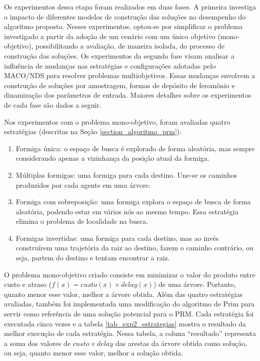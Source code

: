 Os experimentos dessa etapa foram realizados em duas fases. A primeira investiga o impacto de diferentes modelos de construção das soluções no desempenho do algoritmo proposto. Nesses experimentos, optou-se por simplificar o problema investigado a partir da adoção de um cenário com um único objetivo (mono-objetivo), possibilitando a avaliação, de maneira isolada, do processo de construção das soluções. Os experimentos da segunda fase visam analisar a influência de mudanças nas estratégias e configurações adotadas pelo MACO/NDS para resolver problemas multiobjetivos. Essas mudanças envolvem a construção de soluções por amostragem, formas de depósito de feromônio e dinamização dos parâmetros de entrada. Maiores detalhes sobre os experimentos de cada fase são dados a seguir.

Nos experimentos com o problema mono-objetivo, foram avaliadas quatro estratégias (descritas na Seção \ref{section_algoritmo_prm}):

\begin{enumerate}
	\item Formiga única: o espaço de busca é explorado de forma aleatória, mas sempre considerando apenas a vizinhança da posição atual da formiga.
	\item Múltiplas formigas: uma formiga para cada destino. Une-se os caminhos produzidos por cada agente em uma árvore.
	\item Formiga com sobreposição: uma formiga explora o espaço de busca de forma aleatória, podendo estar em vários nós ao mesmo tempo. Essa estratégia elimina o problema de localidade na busca.
	\item Formigas invertidas: uma formiga para cada destino, mas ao invés construírem uma trajetória da raiz ao destino, fazem o caminho contrário, ou seja, partem do destino e tentam encontrar a raiz.
\end{enumerate}

O problema mono-objetivo criado consiste em minimizar o valor do produto entre custo e atraso ($f(x) = custo(x) \times delay(x)$) de uma árvore. Portanto, quanto menor esse valor, melhor a árvore obtida. Além das quatro estratégias avaliadas, também foi implementada uma modificação do algoritmo de Prim \cite{Prim1957} para servir como referência de uma solução potencial para o PRM. Cada estratégia foi executada cinco vezes e a tabela \ref{tab_exp2_estrategias} mostra o resultado da melhor execução de cada estratégia. Nessa tabela, a coluna ``resultado'' representa a soma dos valores de $custo \times delay$ das arestas da árvore obtida como solução, ou seja, quanto menor esse valor, melhor a solução obtida.

